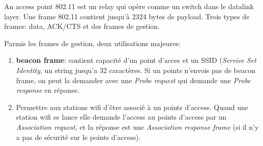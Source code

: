 An access point 802.11 est un relay qui opère comme un switch dans le datalink layer. Une frame 802.11 contient jusqu'à 2324 bytes de payload. Trois types de frames: data, ACK/CTS et des frames de gestion.

Parmis les frames de gestion, deux utilisations majeures:
\begin{enumerate}
\item \textbf{beacon frame}: contient capacité d'un point d'acces et un SSID (\textit{Service Set Identity}, un string jusqu'a 32 caractères. Si un points n'envois pas de beacon frame, on peut la demander avec une \textit{Probe request} qui demande une \textit{Probe response} en réponse.
\item Permettre aux stations wifi d'être associé à un points d'access. Quand une station wifi se lance elle demande l'access au points d'access par un \textit{Association request}, et la réponse est une \textit{Association response frame} (si il n'y a pas de sécurité sur le points d'access).
\end{enumerate}

\biblio


